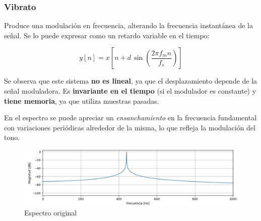 \documentclass[12pt]{article}
\begin{document}

\subsubsection{Vibrato}

Produce una modulación en frecuencia, alterando la frecuencia instantánea de la señal. Se lo puede expresar como un retardo variable en el tiempo:

\[
y[n] = x\!\left[n + d \, \sin\!\left( \frac{2\pi f_m n}{f_s} \right)\right]
\]

Se observa que este sistema \textbf{no es lineal}, ya que el desplazamiento depende de la señal moduladora.  
Es \textbf{invariante en el tiempo} (si el modulador es constante) y \textbf{tiene memoria}, ya que utiliza muestras pasadas.  

En el espectro se puede apreciar un \textit{ensanchamiento} en la frecuencia fundamental con variaciones periódicas alrededor de la misma, lo que refleja la modulación del tono.

\iffalse
\begin{figure}[H]
    \centering
    \includegraphics[width=0.75\linewidth]{plot/vibrato_original.png}
    \caption{Espectro original}
    \label{vibrato_original}
\end{figure}
\end{document}
